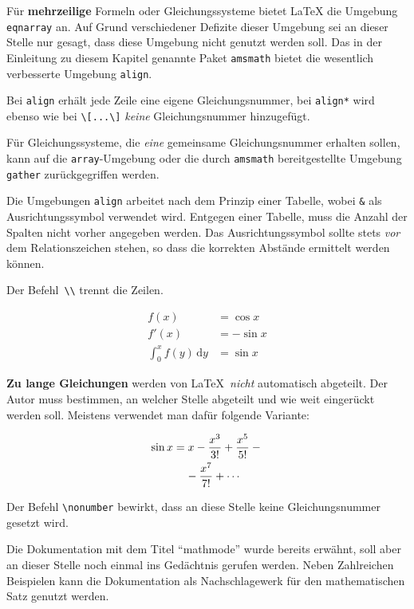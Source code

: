 Für \textbf{mehrzeilige} Formeln oder Gleichungssysteme bietet \LaTeX{} die
Umgebung \texttt{eqnarray} an. Auf Grund verschiedener Defizite dieser
Umgebung sei an dieser Stelle nur gesagt, dass diese Umgebung nicht genutzt
werden soll. Das in der Einleitung zu diesem Kapitel genannte Paket
\texttt{amsmath} bietet die wesentlich verbesserte Umgebung \texttt{align}.

Bei \texttt{align} erhält jede Zeile eine eigene
Gleichungsnummer, bei \texttt{align*} wird ebenso wie bei
\lstinline|\[...\]| \emph{keine} Gleichungsnummer hinzugefügt.

Für Gleichungssysteme, die \emph{eine} gemeinsame Gleichungsnummer
erhalten sollen, kann auf die \texttt{array}-Umgebung oder die durch \texttt{amsmath}
bereitgestellte Umgebung \texttt{gather} zurückgegriffen werden.

Die Umgebungen \texttt{align} arbeitet nach dem Prinzip einer Tabelle, wobei \texttt{\&} als
Ausrichtungssymbol verwendet wird. Entgegen einer Tabelle, muss die Anzahl der Spalten nicht vorher
angegeben werden. Das Ausrichtungssymbol sollte stets \emph{vor} dem Relationszeichen stehen, so
dass die korrekten Abstände ermittelt werden können.

Der Befehl~\lstinline|\\| trennt die Zeilen.
\begin{LTXexample}
\begin{align}
f(x) & =  \cos x       \\
f'(x) & =  -\sin x     \\
\int_{0}^{x} f(y)\,\mathrm{d}y &
 =  \sin x
\end{align}
\end{LTXexample}



\textbf{Zu lange Gleichungen} werden von \LaTeX\ \textit{nicht}
automatisch abgeteilt.
Der Autor muss bestimmen, an welcher Stelle abgeteilt und wie
weit eingerückt werden soll.
Meistens verwendet man dafür folgende Variante:

\begin{LTXexample}
\begin{align}
\sin x & =  x -\frac{x^{3}}{3!}
     +\frac{x^{5}}{5!} - {}
                    \nonumber\\
 &\mathrel{\phantom{=}}\negmedspace{}
  -\frac{x^{7}}{7!} + \cdots
\end{align}
\end{LTXexample}

Der Befehl \lstinline|\nonumber| bewirkt, dass an diese Stelle keine
Gleichungsnummer gesetzt wird.

Die Dokumentation mit dem Titel \enquote{mathmode} wurde bereits erwähnt, soll aber an dieser Stelle
noch einmal ins Gedächtnis gerufen werden. Neben Zahlreichen Beispielen kann
die Dokumentation als Nachschlagewerk für den mathematischen Satz genutzt werden.

\endinput
